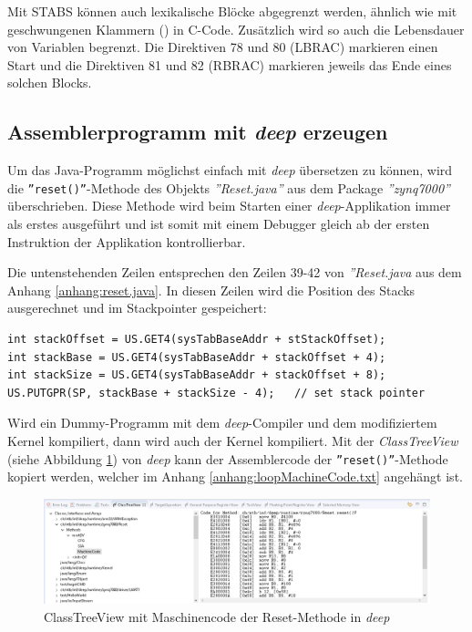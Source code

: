 Mit STABS können auch lexikalische Blöcke abgegrenzt werden, ähnlich wie mit geschwungenen Klammern ({}) in C-Code.
Zusätzlich wird so auch die Lebensdauer von Variablen begrenzt.
Die Direktiven 78 und 80 (LBRAC) markieren einen Start und die Direktiven 81 und 82 (RBRAC) markieren jeweils das Ende eines solchen Blocks.


\subsection{Assemblerprogramm mit \textit{deep} erzeugen}
Um das Java-Programm möglichst einfach mit \textit{deep} übersetzen zu können, wird die \texttt{''reset()''}-Methode des Objekts \textit{''Reset.java''} aus dem Package \textit{''zynq7000''} überschrieben.
Diese Methode wird beim Starten einer \textit{deep}-Applikation immer als erstes ausgeführt und ist somit mit einem Debugger gleich ab der ersten Instruktion der Applikation kontrollierbar.

Die untenstehenden Zeilen entsprechen den Zeilen 39-42 von \textit{''Reset.java} aus dem Anhang \ref{anhang:reset.java}.
In diesen Zeilen wird die Position des Stacks ausgerechnet und im Stackpointer gespeichert:
\lstset{language=java}
\begin{lstlisting}
int stackOffset = US.GET4(sysTabBaseAddr + stStackOffset);
int stackBase = US.GET4(sysTabBaseAddr + stackOffset + 4);
int stackSize = US.GET4(sysTabBaseAddr + stackOffset + 8);
US.PUTGPR(SP, stackBase + stackSize - 4);	// set stack pointer
\end{lstlisting}

Wird ein Dummy-Programm mit dem \textit{deep}-Compiler und dem modifiziertem Kernel kompiliert, dann wird auch der Kernel kompiliert.
Mit der \textit{ClassTreeView} (siehe Abbildung \ref{fig:MaschineCode.ClassTreeView.Deep}) von \textit{deep} kann der Assemblercode der \texttt{''reset()''}-Methode kopiert werden, welcher im Anhang \ref{anhang:loopMachineCode.txt} angehängt ist.

\begin{figure}[htbp]
	\centering
		\includegraphics[width=\textwidth,height=\textheight,keepaspectratio]{images/MaschineCode_ClassTreeView_Deep.PNG}
	\caption[]{ClassTreeView mit Maschinencode der Reset-Methode in \textit{deep}}
	\label{fig:MaschineCode.ClassTreeView.Deep}
\end{figure}


